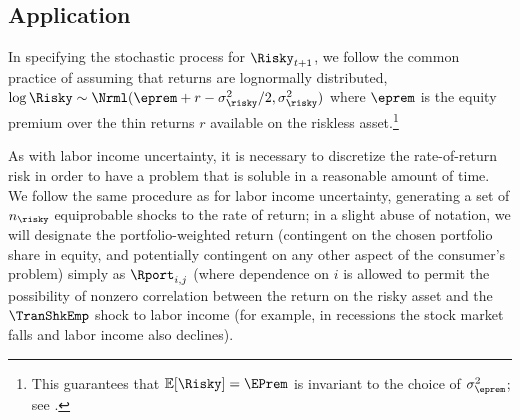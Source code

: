 \documentclass[titlepage, headings=optiontotocandhead]{Resources/texmf-local/tex/latex/econtex}
\begin{document}


\subsection{Application}\label{subsec:MCApplication}


In specifying the stochastic process for $\Risky_{t+1}$, we follow the common practice of assuming that returns are lognormally distributed, $\log \Risky \sim \Nrml(\eprem+r-\sigma^{2}_{\risky}/2,\sigma^{2}_{\risky})$ where $\eprem$ is the equity premium over the thin returns $r$ available on the riskless asset.\footnote{This guarantees that $\Ex[\Risky] = \EPrem$ is invariant to the choice of $\sigma^{2}_{\eprem}$; see .}

As with labor income uncertainty, it is necessary to discretize the rate-of-return risk in order to have a problem that is soluble in a reasonable amount of time.  We follow the same procedure as for labor income uncertainty, generating a set of $n_{\risky}$ equiprobable shocks to the rate of return; in a slight abuse of notation, we will designate the portfolio-weighted return (contingent on the chosen portfolio share in equity, and potentially contingent on any other aspect of the consumer's problem) simply as $\Rport_{i,j}$ (where dependence on $i$ is allowed to permit the possibility of nonzero correlation between the return on the risky asset and the $\TranShkEmp$ shock to labor income (for example, in recessions the stock market falls and labor income also declines).
\end{document}
